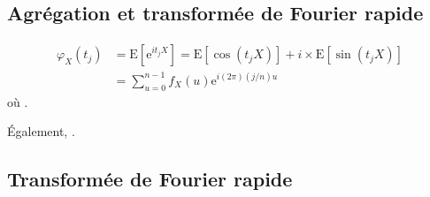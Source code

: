\documentclass[10pt, french]{article}
\begin{document}
\begin{multicols*}{2}
\begin{definitionNOHFILLprop}
\end{definitionNOHFILLprop}



\columnbreak
\subsection{Agrégation et transformée de Fourier rapide}
\begin{align*}
	\varphi_{X}(t_{j})
	&=	\text{E}[\textrm{e}^{it_{j}X}]
	=	\text{E}[\cos(t_{j}X)] + i \times \text{E}[\sin(t_{j}X)]	\\
	&=	\sum_{u = 0}^{n - 1} f_{X}(u) \textrm{e}^{i (2\pi) (j / n) u}
\end{align*}
où .

Également, .



\columnbreak
\subsection{Transformée de Fourier rapide}


\end{multicols*}
\end{document}
